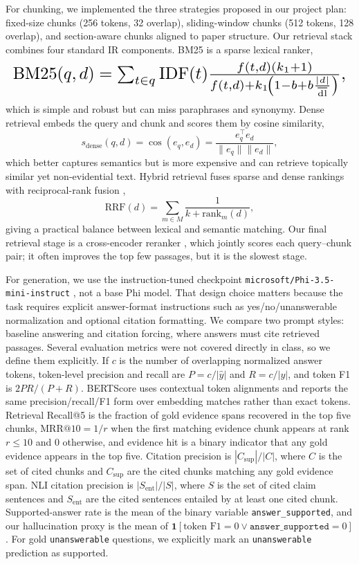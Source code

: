 \documentclass[11pt]{article}
\begin{document}
For chunking, we implemented the three strategies proposed in our project plan: fixed-size chunks (256 tokens, 32 overlap), sliding-window chunks (512 tokens, 128 overlap), and section-aware chunks aligned to paper structure. Our retrieval stack combines four standard IR components. BM25 \citep{robertson2009bm25} is a sparse lexical ranker,
\[
\resizebox{\columnwidth}{!}{$
\mathrm{BM25}(q,d)=\sum_{t\in q}\mathrm{IDF}(t)\frac{f(t,d)(k_1+1)}{f(t,d)+k_1\!\left(1-b+b\frac{|d|}{\overline{\mathrm{dl}}}\right)},
$}
\]
which is simple and robust but can miss paraphrases and synonymy. Dense retrieval \citep{karpukhin2020dpr,xiao2023bge} embeds the query and chunk and scores them by cosine similarity,
\[
s_{\mathrm{dense}}(q,d)=\cos(e_q,e_d)=\frac{e_q^\top e_d}{\lVert e_q\rVert \lVert e_d\rVert},
\]
which better captures semantics but is more expensive and can retrieve topically similar yet non-evidential text. Hybrid retrieval fuses sparse and dense rankings with reciprocal-rank fusion \citep{cormack2009rrf},
\[
\mathrm{RRF}(d)=\sum_{m\in M}\frac{1}{k+\mathrm{rank}_m(d)},
\]
giving a practical balance between lexical and semantic matching. Our final retrieval stage is a cross-encoder reranker \citep{nogueira2019bert}, which jointly scores each query--chunk pair; it often improves the top few passages, but it is the slowest stage.

For generation, we use the instruction-tuned checkpoint \texttt{microsoft/Phi-3.5-mini-instruct} \citep{microsoft2024phi3}, not a base Phi model. That design choice matters because the task requires explicit answer-format instructions such as yes/no/unanswerable normalization and optional citation formatting. We compare two prompt styles: baseline answering and citation forcing, where answers must cite retrieved passages. Several evaluation metrics were not covered directly in class, so we define them explicitly. If $c$ is the number of overlapping normalized answer tokens, token-level precision and recall are $P=c/|\hat{y}|$ and $R=c/|y|$, and token F1 is $2PR/(P+R)$. BERTScore uses contextual token alignments and reports the same precision/recall/F1 form over embedding matches rather than exact tokens. Retrieval Recall@5 is the fraction of gold evidence spans recovered in the top five chunks, $\mathrm{MRR}@10=1/r$ when the first matching evidence chunk appears at rank $r\le 10$ and $0$ otherwise, and evidence hit is a binary indicator that any gold evidence appears in the top five. Citation precision is $|C_{\mathrm{sup}}|/|C|$, where $C$ is the set of cited chunks and $C_{\mathrm{sup}}$ are the cited chunks matching any gold evidence span. NLI citation precision is $|S_{\mathrm{ent}}|/|S|$, where $S$ is the set of cited claim sentences and $S_{\mathrm{ent}}$ are the cited sentences entailed by at least one cited chunk. Supported-answer rate is the mean of the binary variable \texttt{answer\_supported}, and our hallucination proxy is the mean of $\mathbf{1}[\text{token F1}=0 \lor \texttt{answer\_supported}=0]$. For gold \texttt{unanswerable} questions, we explicitly mark an \texttt{unanswerable} prediction as supported.
\end{document}
